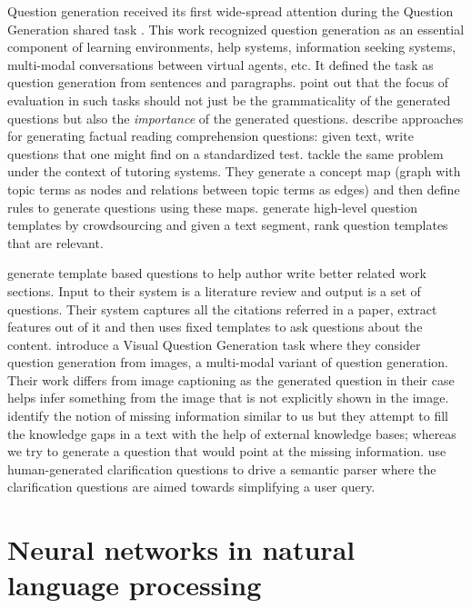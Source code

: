 \documentclass[11pt]{report}
\renewcommand\cite{\citep}	%
\begin{document}
Question generation received its first wide-spread attention during the Question Generation shared task \cite{rus2010first,rus2011question}. This work recognized question generation as an essential component of learning environments, help systems, information seeking systems, multi-modal conversations between virtual agents, etc. It defined the task as question generation from sentences and paragraphs. \cite{vanderwende2008importance} point out that the focus of evaluation in such tasks should not just be the grammaticality of the generated questions but also the \textit{importance} of the generated questions.  \cite{heilman2011automatic} describe approaches for generating factual reading comprehension questions: given text, write questions that one might find on a standardized test. \cite{olney2012question} tackle the same problem under the context of tutoring systems. They generate a concept map (graph with topic terms as nodes and relations between topic terms as edges) and then define rules to generate questions using these maps. \cite{labutov2015deep} generate high-level question templates by crowdsourcing and given a text segment, rank question templates that are relevant.

 \cite{liu2010automatic} generate template based questions to help author write better related work sections. Input to their system is a literature review and output is a set of questions. Their system captures all the citations referred in a paper, extract features out of it and then uses fixed templates to ask questions about the content. \cite{mostafazadeh2016generating} introduce a Visual Question Generation task where they consider question generation from images, a multi-modal variant of question generation. Their work differs from image captioning as the generated question in their case helps infer something from the image that is not explicitly shown in the image. \cite{penas2010filling} identify the notion of missing information similar to us but they attempt to fill the knowledge gaps in a text with the help of external knowledge bases; whereas we try to generate a question that would point at the missing information. \cite{artzi2011bootstrapping} use human-generated clarification questions to drive a semantic parser where the clarification questions are aimed towards simplifying a user query.

\section{Neural networks in natural language processing}
\end{document}
